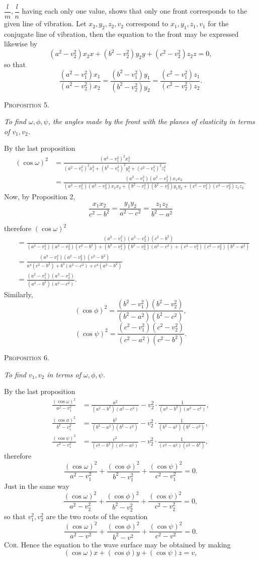 \documentclass[11pt]{article}
\newcommand{\proposition}[1]{\vspace{0.9em}\begin{center}{\scshape Proposition #1.}\end{center}\vspace{0.2em}}
\newcommand{\sourcepage}[1]{\marginpar{\scriptsize p.~#1}}
\begin{document}
$\dfrac{l}{m},\dfrac{l}{n}$ having each only one value, shows that only one front corresponds to the given line of vibration. Let $x_2,y_2,z_2,v_2$ correspond to $x_1,y_1,z_1,v_1$ for the conjugate line of vibration, then the equation to the front may be expressed likewise by
\[
 (a^2-v_2^2)x_2x+(b^2-v_2^2)y_2y+(c^2-v_2^2)z_2z=0,
\]
so that
\[
 \frac{(a^2-v_1^2)x_1}{(a^2-v_2^2)x_2}
 =\frac{(b^2-v_1^2)y_1}{(b^2-v_2^2)y_2}
 =\frac{(c^2-v_1^2)z_1}{(c^2-v_2^2)z_2}.
\]

\proposition{5}

\emph{To find $\omega,\phi,\psi$, the angles made by the front with the planes of elasticity in terms of $v_1,v_2$.}

By the last proposition
\begin{align*}
(\cos\omega)^2
&=\frac{(a^2-v_1^2)^2x_1^2}{(a^2-v_1^2)^2x_1^2+(b^2-v_1^2)^2y_1^2+(c^2-v_1^2)^2z_1^2}\\
&=\frac{(a^2-v_1^2)(a^2-v_2^2)x_1x_2}
{(a^2-v_1^2)(a^2-v_2^2)x_1x_2+(b^2-v_1^2)(b^2-v_2^2)y_1y_2+(c^2-v_1^2)(c^2-v_2^2)z_1z_2}.
\end{align*}
Now, by Proposition 2,
\[
 \frac{x_1x_2}{c^2-b^2}=\frac{y_1y_2}{a^2-c^2}=\frac{z_1z_2}{b^2-a^2}
\]

\sourcepage{6}
therefore $(\cos\omega)^2$
\begin{align*}
&=\frac{(a^2-v_1^2)(a^2-v_2^2)(c^2-b^2)}
{(a^2-v_1^2)(a^2-v_2^2)(c^2-b^2)+(b^2-v_1^2)(b^2-v_2^2)(a^2-c^2)+(c^2-v_1^2)(c^2-v_2^2)(b^2-a^2)}\\
&=\frac{(a^2-v_1^2)(a^2-v_2^2)(c^2-b^2)}{a^4(c^2-b^2)+b^4(a^2-c^2)+c^4(a^2-b^2)}\\
&=\frac{(a^2-v_1^2)(a^2-v_2^2)}{(a^2-b^2)(a^2-c^2)}.
\end{align*}
Similarly,
\[
 (\cos\phi)^2=\frac{(b^2-v_1^2)(b^2-v_2^2)}{(b^2-a^2)(b^2-c^2)},
\]
\[
 (\cos\psi)^2=\frac{(c^2-v_1^2)(c^2-v_2^2)}{(c^2-a^2)(c^2-b^2)}.
\]

\proposition{6}

\emph{To find $v_1,v_2$ in terms of $\omega,\phi,\psi$.}

By the last proposition
\begin{align*}
\frac{(\cos\omega)^2}{a^2-v_1^2}
&=\frac{a^2}{(a^2-b^2)(a^2-c^2)}
-v_2^2\cdot\frac{1}{(a^2-b^2)(a^2-c^2)},\\
\frac{(\cos\phi)^2}{b^2-v_1^2}
&=\frac{b^2}{(b^2-a^2)(b^2-c^2)}
-v_2^2\cdot\frac{1}{(b^2-a^2)(b^2-c^2)},\\
\frac{(\cos\psi)^2}{c^2-v_1^2}
&=\frac{c^2}{(c^2-b^2)(c^2-a^2)}
-v_2^2\cdot\frac{1}{(c^2-a^2)(c^2-b^2)},
\end{align*}
therefore
\[
 \frac{(\cos\omega)^2}{a^2-v_1^2}
+\frac{(\cos\phi)^2}{b^2-v_1^2}
+\frac{(\cos\psi)^2}{c^2-v_1^2}=0.
\]
Just in the same way
\[
 \frac{(\cos\omega)^2}{a^2-v_2^2}
+\frac{(\cos\phi)^2}{b^2-v_2^2}
+\frac{(\cos\psi)^2}{c^2-v_2^2}=0,
\]
so that $v_1^2,v_2^2$ are the two roots of the equation
\[
 \frac{(\cos\omega)^2}{a^2-v^2}
+\frac{(\cos\phi)^2}{b^2-v^2}
+\frac{(\cos\psi)^2}{c^2-v^2}=0.
\]
\textsc{Cor.} Hence the equation to the wave surface may be obtained by making
\[
 (\cos\omega)x+(\cos\phi)y+(\cos\psi)z=v,
\]
\end{document}
